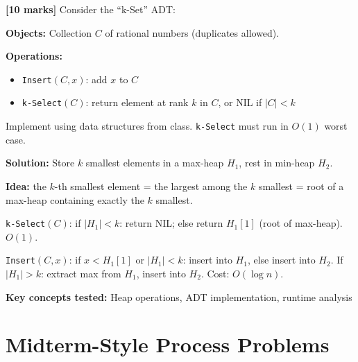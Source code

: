 \documentclass[11pt]{article}
\begin{document}
\begin{exambox}
\textbf{[10 marks]} Consider the ``k-Set'' ADT:

\textbf{Objects:} Collection $C$ of rational numbers (duplicates allowed).

\textbf{Operations:}
\begin{itemize}[leftmargin=1.4em,itemsep=1pt]
    \item \texttt{Insert$(C, x)$}: add $x$ to $C$
    \item \texttt{k-Select$(C)$}: return element at rank $k$ in $C$, or NIL if $|C| < k$
\end{itemize}

Implement using data structures from class. \texttt{k-Select} must run in \textcolor{greenO}{$O(1)$} worst case.

\begin{answerband}
\textbf{Solution:} Store $k$ smallest elements in a \textcolor{rustW}{max-heap} $H_1$, rest in \textcolor{rustW}{min-heap} $H_2$.

\textbf{Idea:} the $k$-th smallest element = the largest among the $k$ smallest = root of a max-heap containing exactly the $k$ smallest.

\texttt{k-Select$(C)$}: if $|H_1| < k$: return NIL; else return $H_1[1]$ (root of max-heap). $O(1)$.

\texttt{Insert$(C, x)$}: if $x < H_1[1]$ or $|H_1| < k$: insert into $H_1$, else insert into $H_2$. If $|H_1| > k$: extract max from $H_1$, insert into $H_2$. Cost: \textcolor{greenO}{$O(\log n)$}.

\medskip
\textcolor{violetT}{\textbf{Key concepts tested:}} Heap operations, ADT implementation, runtime analysis
\end{answerband}
\end{exambox}

\section{Midterm-Style Process Problems}
\end{document}
